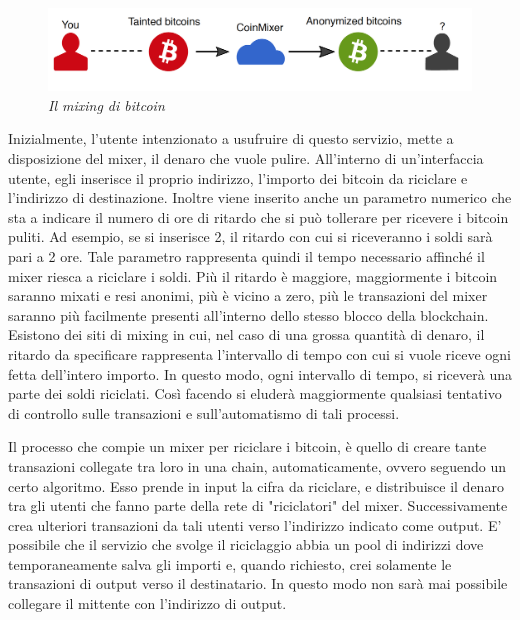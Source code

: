 \begin{figure}[htbp]
	\centering
	\includegraphics[width = \linewidth]{figure/mixingschema}
	\caption{\textit{Il mixing di bitcoin }\cite{coinmixer}}\label{fig:mixingschema}
\end{figure}

Inizialmente, l'utente intenzionato a usufruire di questo servizio, mette a disposizione del mixer, il denaro che vuole pulire. All'interno di un'interfaccia utente, egli inserisce il proprio indirizzo, l'importo dei bitcoin da riciclare e l'indirizzo di destinazione. Inoltre viene inserito anche un parametro numerico che sta a indicare il numero di ore di ritardo che si può tollerare per ricevere i bitcoin puliti. Ad esempio, se si inserisce 2, il ritardo con cui si riceveranno i soldi sarà pari a 2 ore. Tale parametro rappresenta quindi il tempo necessario affinché il mixer riesca a riciclare i soldi. Più il ritardo è maggiore, maggiormente i bitcoin saranno mixati e resi anonimi, più è vicino a zero, più le transazioni del mixer saranno più facilmente presenti all'interno dello stesso blocco della blockchain.
Esistono dei siti di mixing in cui, nel caso di una grossa quantità di denaro, il ritardo da specificare rappresenta l'intervallo di tempo con cui si vuole riceve ogni fetta dell'intero importo. In questo modo, ogni intervallo di tempo, si riceverà una parte dei soldi riciclati. Così facendo si eluderà maggiormente qualsiasi tentativo di controllo sulle transazioni e sull'automatismo di tali processi.

Il processo che compie un mixer per riciclare i bitcoin, è quello di creare tante transazioni collegate tra loro in una chain, automaticamente, ovvero seguendo un certo algoritmo. Esso prende in input la cifra da riciclare, e distribuisce il denaro tra gli utenti che fanno parte della rete di "riciclatori" del mixer. Successivamente crea ulteriori transazioni da tali utenti verso l'indirizzo indicato come output. E' possibile che il servizio che svolge il riciclaggio abbia un pool di indirizzi dove temporaneamente salva gli importi e, quando richiesto, crei solamente le transazioni di output verso il destinatario. In questo modo non sarà mai possibile collegare il mittente con l'indirizzo di output. 

